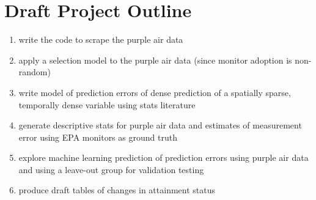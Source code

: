 \documentclass[twocolumn, 12pt]{article}
\begin{document}
\newpage
\section{Draft Project Outline}
\begin{enumerate}
    \item write the code to scrape the purple air data
    \item apply a selection model to the purple air data (since monitor adoption is non-random)
    \item write model of prediction errors of dense prediction of a spatially sparse, temporally dense variable using stats literature
    \item generate descriptive stats for purple air data and estimates of measurement error using EPA monitors as ground truth
    \item explore machine learning prediction of prediction errors using purple air data and using a leave-out group for validation testing
    \item produce draft tables of changes in attainment status
\end{enumerate}


  





\end{document}
